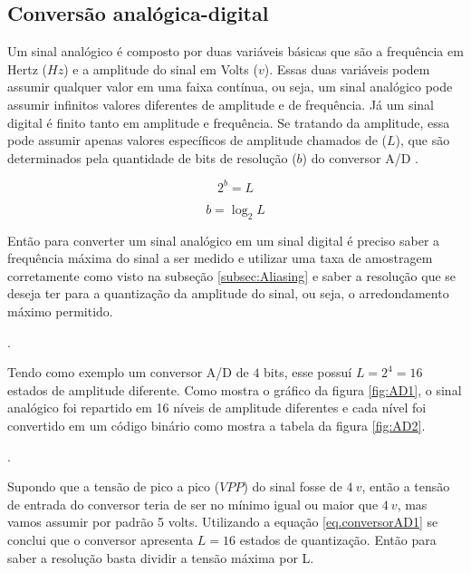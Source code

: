 \newpage

\subsection{Conversão analógica-digital}

Um sinal analógico é composto por duas variáveis básicas que são a frequência em Hertz ($Hz$) e a amplitude do sinal em Volts ($v$). Essas duas variáveis podem assumir qualquer valor em uma faixa contínua, ou seja, um sinal analógico pode assumir infinitos valores diferentes de amplitude e de frequência. Já um sinal digital é finito tanto em amplitude e frequência. Se tratando da amplitude, essa pode assumir apenas valores específicos de amplitude chamados de ($L$), que são determinados pela quantidade de bits de resolução ($b$) do conversor A/D \cite{Lathi2018}. 

\begin{equation}\label{eq.conversorAD1}
    2^b = L
\end{equation}

\begin{equation}
    b = \log _{2} L
\end{equation}




Então para converter um sinal analógico em um sinal digital é preciso saber a frequência máxima do sinal a ser medido e utilizar uma taxa de amostragem corretamente como visto na subseção \ref{subsec:Aliasing} e saber a resolução que se deseja ter para a quantização da amplitude do sinal, ou seja, o arredondamento máximo permitido. 

.

Tendo como exemplo um conversor A/D de $4$ bits, esse possuí $L =2^4= 16$ estados de amplitude diferente. Como mostra o gráfico da figura \ref{fig:AD1}, o sinal analógico foi repartido em 16 níveis de amplitude diferentes e cada nível foi convertido em um código binário como mostra a tabela da figura \ref{fig:AD2}.
 

.


Supondo que a tensão de pico a pico ($VPP$) do sinal fosse de $4 \ v$, então a tensão de entrada do conversor teria de ser no mínimo igual ou maior que $4 \ v$, mas vamos assumir por padrão 5 volts. Utilizando a equação \ref{eq.conversorAD1} se conclui que o conversor apresenta $L=16$ estados de quantização. Então para saber a resolução basta  dividir a tensão máxima por L.

